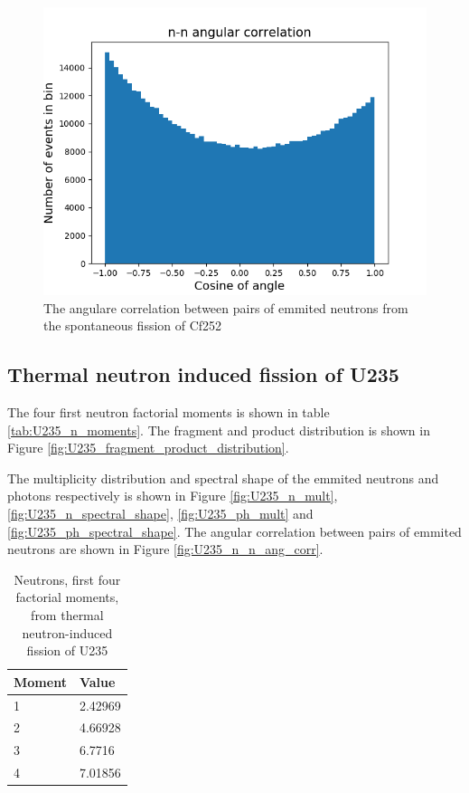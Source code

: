 \documentclass[]{article}
\begin{document}
\begin{figure} [H]
	\centering
	\includegraphics[scale=0.7]{Cf252_sf_n_n_ang_corr.png}
	\caption{The angulare correlation between pairs of emmited neutrons from the spontaneous fission of Cf252}
	\label{fig:Cf252_sf_n_n_ang_corr}
\end{figure}
	
\subsection{Thermal neutron induced fission of U235}

The four first neutron factorial moments is shown in table \ref{tab:U235_n_moments}. The fragment and product distribution is shown in Figure \ref{fig:U235_fragment_product_distribution}. 

The multiplicity distribution and spectral shape of the emmited neutrons and photons respectively is shown in Figure \ref{fig:U235_n_mult}, \ref{fig:U235_n_spectral_shape}, \ref{fig:U235_ph_mult} and \ref{fig:U235_ph_spectral_shape}. The angular correlation between pairs of emmited neutrons are shown in Figure \ref{fig:U235_n_n_ang_corr}.

\begin{table} [H]
	\centering
	\caption{Neutrons, first four factorial moments, from thermal neutron-induced fission of U235 }
	\begin{tabularx}{\textwidth}{XX} \hline
		\label{U235_n_moments}
		Moment & Value \\ \hline
		1 & 2.42969 \\
		2 & 4.66928\\
		3 & 6.7716\\
		4 & 7.01856\\ 
	\end{tabularx}
\end{table}
\end{document}
